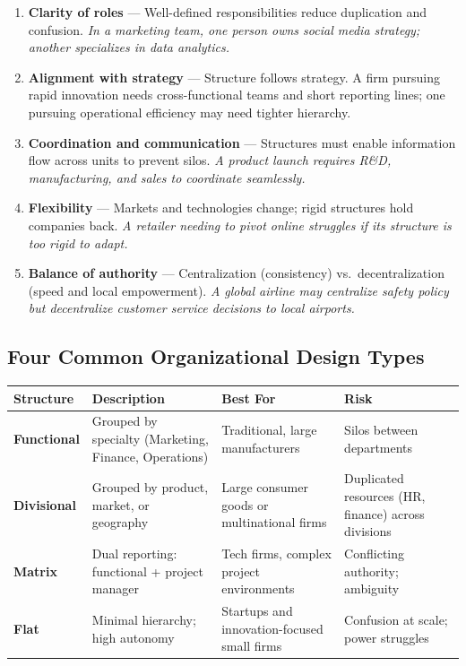 \documentclass[11pt, letterpaper]{article}
\begin{document}
\begin{enumerate}[leftmargin=*, label=\textbf{\arabic*.}]
  \item \textbf{Clarity of roles} --- Well-defined responsibilities reduce duplication and confusion. \textit{In a marketing team, one person owns social media strategy; another specializes in data analytics.}
  \item \textbf{Alignment with strategy} --- Structure follows strategy. A firm pursuing rapid innovation needs cross-functional teams and short reporting lines; one pursuing operational efficiency may need tighter hierarchy.
  \item \textbf{Coordination and communication} --- Structures must enable information flow across units to prevent silos. \textit{A product launch requires R\&D, manufacturing, and sales to coordinate seamlessly.}
  \item \textbf{Flexibility} --- Markets and technologies change; rigid structures hold companies back. \textit{A retailer needing to pivot online struggles if its structure is too rigid to adapt.}
  \item \textbf{Balance of authority} --- Centralization (consistency) vs.\ decentralization (speed and local empowerment). \textit{A global airline may centralize safety policy but decentralize customer service decisions to local airports.}
\end{enumerate}

\subsection{Four Common Organizational Design Types}

\begin{center}
\begin{tabular}{>{\bfseries}p{2.5cm} p{4.5cm} p{4.5cm} p{2cm}}
\toprule
Structure & Description & Best For & Risk \\
\midrule
Functional & Grouped by specialty (Marketing, Finance, Operations) & Traditional, large manufacturers & Silos between departments \\
\addlinespace
Divisional & Grouped by product, market, or geography & Large consumer goods or multinational firms & Duplicated resources (HR, finance) across divisions \\
\addlinespace
Matrix & Dual reporting: functional + project manager & Tech firms, complex project environments & Conflicting authority; ambiguity \\
\addlinespace
Flat & Minimal hierarchy; high autonomy & Startups and innovation-focused small firms & Confusion at scale; power struggles \\
\bottomrule
\end{tabular}
\end{center}
\end{document}
